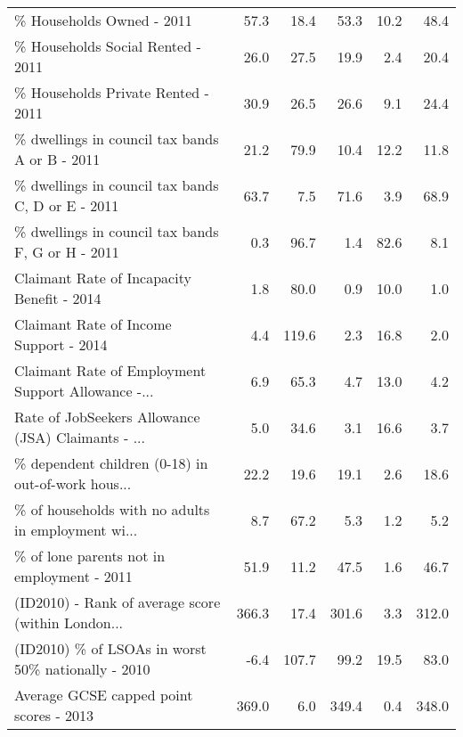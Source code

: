 \documentclass[conference]{IEEEtran}
\begin{document}
\begin{table*}[t]
\begin{tabular}{lrrrrr}
\% Households Owned - 2011                          &           57.3 &       18.4 &           53.3 &       10.2 &    48.4 \\
\% Households Social Rented - 2011                  &           26.0 &       27.5 &           19.9 &        2.4 &    20.4 \\
\% Households Private Rented - 2011                 &           30.9 &       26.5 &           26.6 &        9.1 &    24.4 \\
\% dwellings in council tax bands A or B - 2011     &           21.2 &       79.9 &           10.4 &       12.2 &    11.8 \\
\% dwellings in council tax bands C, D or E - 2011  &           63.7 &        7.5 &           71.6 &        3.9 &    68.9 \\
\% dwellings in council tax bands F, G or H - 2011  &            0.3 &       96.7 &            1.4 &       82.6 &     8.1 \\
Claimant Rate of Incapacity Benefit - 2014         &            1.8 &       80.0 &            0.9 &       10.0 &     1.0 \\
Claimant Rate of Income Support - 2014             &            4.4 &      119.6 &            2.3 &       16.8 &     2.0 \\
Claimant Rate of Employment Support Allowance -... &            6.9 &       65.3 &            4.7 &       13.0 &     4.2 \\
Rate of JobSeekers Allowance (JSA) Claimants - ... &            5.0 &       34.6 &            3.1 &       16.6 &     3.7 \\
\% dependent children (0-18) in out-of-work hous... &           22.2 &       19.6 &           19.1 &        2.6 &    18.6 \\
\% of households with no adults in employment wi... &            8.7 &       67.2 &            5.3 &        1.2 &     5.2 \\
\% of lone parents not in employment - 2011         &           51.9 &       11.2 &           47.5 &        1.6 &    46.7 \\
(ID2010) - Rank of average score (within London... &          366.3 &       17.4 &          301.6 &        3.3 &   312.0 \\
(ID2010) \% of LSOAs in worst 50\% nationally - 2010 &           -6.4 &      107.7 &           99.2 &       19.5 &    83.0 \\
Average GCSE capped point scores - 2013            &          369.0 &        6.0 &          349.4 &        0.4 &   348.0 \\

\end{tabular}
\end{table*}
\end{document}
